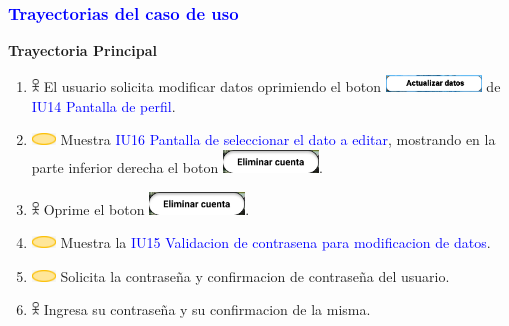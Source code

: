 \subsubsection{\textcolor{blue}{Trayectorias del caso de uso}}
\textbf{Trayectoria Principal}
    \begin{enumerate}
        \item \includegraphics[width=0.0150\textwidth]{Figuras/persona.png} El usuario solicita modificar datos oprimiendo el boton \includegraphics[width=0.2\textwidth]{ComponentesCU/AD.png}  de \textcolor{blue}{IU14 Pantalla de perfil}.
        \item \includegraphics[width=0.0500\textwidth]{Figuras/sistema.png} Muestra \textcolor{blue}{IU16 Pantalla de seleccionar el dato a editar}, mostrando en la parte inferior derecha el boton \includegraphics[width=0.2\textwidth]{ComponentesCU/img.png}.
        \item \includegraphics[width=0.0150\textwidth]{Figuras/persona.png} Oprime el boton \includegraphics[width=0.2\textwidth]{ComponentesCU/img.png}.
         \item \includegraphics[width=0.0500\textwidth]{Figuras/sistema.png} Muestra la \textcolor{blue}{IU15 Validacion de contrasena para modificacion de datos}.
        \item \includegraphics[width=0.0500\textwidth]{Figuras/sistema.png} Solicita la contraseña y confirmacion de contraseña del usuario.
        \item \includegraphics[width=0.0150\textwidth]{Figuras/persona.png} Ingresa su contraseña y su confirmacion de la misma.

\end{enumerate}
